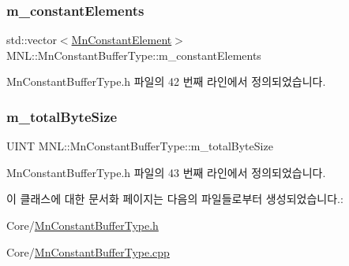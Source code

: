 \subsubsection{\texorpdfstring{m\+\_\+constant\+Elements}{m\_constantElements}}
{\footnotesize\ttfamily std\+::vector$<$\hyperlink{class_m_n_l_1_1_mn_constant_element}{Mn\+Constant\+Element}$>$ M\+N\+L\+::\+Mn\+Constant\+Buffer\+Type\+::m\+\_\+constant\+Elements\hspace{0.3cm}{\ttfamily [private]}}



Mn\+Constant\+Buffer\+Type.\+h 파일의 42 번째 라인에서 정의되었습니다.

\mbox{\label{class_m_n_l_1_1_mn_constant_buffer_type_a27af6863155a8cc6edb48df620a86b56}} 
\subsubsection{\texorpdfstring{m\+\_\+total\+Byte\+Size}{m\_totalByteSize}}
{\footnotesize\ttfamily U\+I\+NT M\+N\+L\+::\+Mn\+Constant\+Buffer\+Type\+::m\+\_\+total\+Byte\+Size\hspace{0.3cm}{\ttfamily [private]}}



Mn\+Constant\+Buffer\+Type.\+h 파일의 43 번째 라인에서 정의되었습니다.



이 클래스에 대한 문서화 페이지는 다음의 파일들로부터 생성되었습니다.\+:\begin{DoxyCompactItemize}
\item 
Core/\hyperlink{_mn_constant_buffer_type_8h}{Mn\+Constant\+Buffer\+Type.\+h}\item 
Core/\hyperlink{_mn_constant_buffer_type_8cpp}{Mn\+Constant\+Buffer\+Type.\+cpp}\end{DoxyCompactItemize}
